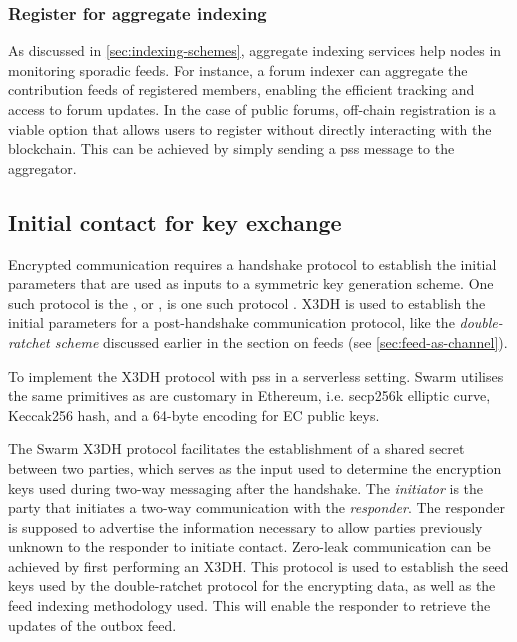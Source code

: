 \subsubsection{Register for aggregate indexing}

As discussed in \ref{sec:indexing-schemes}, aggregate indexing services help nodes in monitoring sporadic feeds. For instance, a forum indexer can aggregate the contribution feeds of registered members, enabling the efficient tracking and access to forum updates. In the case of public forums, off-chain registration is a viable option that allows users to register without directly interacting with the blockchain. This can be achieved by simply sending a pss message to the aggregator. 


\subsection{Initial contact for key exchange\statusgreen}\label{sec:pss-key-exchange}


Encrypted communication requires a handshake protocol to establish the initial parameters that are used as inputs to a symmetric key generation scheme. One such protocol is the , or , is one such protocol \citep{marlinspike2016x3dh}.  X3DH is used to establish the initial parameters for a post-handshake communication protocol, like the \emph{double-ratchet scheme} discussed earlier in the section on feeds (see \ref{sec:feed-as-channel}). 

To implement the X3DH protocol with pss in a serverless setting. Swarm utilises the same primitives as are customary in Ethereum, i.e. secp256k elliptic curve, Keccak256 hash, and a 64-byte encoding for EC public keys. 

The Swarm X3DH protocol facilitates the establishment of a shared secret between two parties, which serves as the input used to determine the encryption keys used during two-way messaging after the handshake. The \emph{initiator} is the party that initiates a two-way communication with the \emph{responder}. The responder is supposed to advertise the information necessary to allow parties previously unknown to the responder to initiate contact. Zero-leak communication can be achieved by first performing an X3DH. This protocol is used to establish the seed keys used by the double-ratchet protocol for the encrypting data, as well as the feed indexing methodology used. This will enable the responder to retrieve the updates of the outbox feed.

